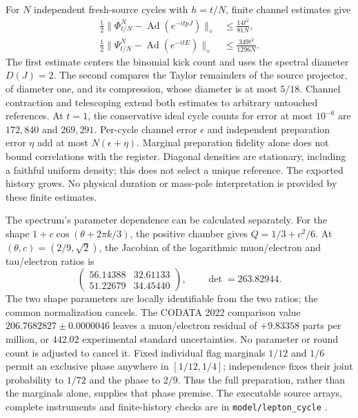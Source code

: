 For $N$ independent fresh-source cycles with $h=t/N$, finite channel estimates
give
\begin{align*}
 \frac12\|\Phi_{t/N}^{N}-\operatorname{Ad}(e^{-itpJ})\|_\diamond
   &\le \frac{14t^2}{81N},\\
 \frac12\|\Psi_{t/N}^{N}-\operatorname{Ad}(e^{-itE})\|_\diamond
   &\le \frac{349t^2}{1296N}.
\end{align*}
The first estimate centers the binomial kick count and uses the spectral
diameter $D(J)=2$. The second compares the Taylor remainders of the source
projector, of diameter one, and its compression, whose diameter is at most
$5/18$. Channel contraction and telescoping extend both estimates to arbitrary
untouched references. At $t=1$, the conservative ideal cycle counts for error
at most $10^{-6}$ are $172{,}840$ and $269{,}291$. Per-cycle channel error
$\epsilon$ and independent preparation error $\eta$ add at most
$N(\epsilon+\eta)$. Marginal preparation fidelity alone does not bound
correlations with the register. Diagonal densities are stationary, including
a faithful uniform density; this does not select a unique reference. The
exported history grows. No physical duration or mass-pole interpretation is
provided by these finite estimates.

The spectrum's parameter dependence can be calculated separately. For the
shape $1+c\cos(\theta+2\pi k/3)$, the positive chamber gives
$Q=1/3+c^2/6$. At $(\theta,c)=(2/9,\sqrt2)$, the Jacobian of the logarithmic
muon/electron and tau/electron ratios is
\[
 \begin{pmatrix}56.14388&32.61133\\51.22679&34.45440\end{pmatrix},
 \qquad \det=263.82944.
\]
The two shape parameters are locally identifiable from the two ratios; the
common normalization cancels. The CODATA 2022 comparison value
$206.7682827\pm0.0000046$ leaves a muon/electron residual of $+9.83358$
parts per million, or $442.02$ experimental standard uncertainties. No parameter
or round count is adjusted to cancel it. Fixed individual flag marginals
$1/12$ and $1/6$ permit an exclusive phase anywhere in $[1/12,1/4]$;
independence fixes their joint probability to $1/72$ and the phase to $2/9$.
Thus the full preparation, rather than the marginals alone, supplies that
phase premise. The executable source arrays, complete instruments and
finite-history checks are in \texttt{model/lepton\_cycle} \cite{ophrepo}.

